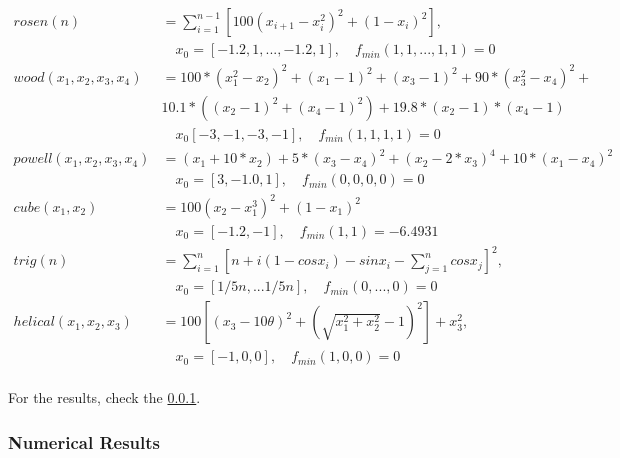 \documentclass[a4paper,11pt]{article}
\numberwithin{equation}{section} %
\begin{document}
\begin{align*}
    rosen(n) &= \sum_{i=1}^{n-1} [100 (x_{i+1}-x_i^2)^2 + (1-x_i)^2], \\ &\quad x_0 = [-1.2,1,...,-1.2,1], \quad f_{min}(1,1,...,1,1)=0  \\
    wood(x_1,x_2,x_3,x_4) &= 100*(x_1^2-x_2)^2 + (x_1-1)^2 + (x_3-1)^2 + 90*(x_3^2 - x_4)^2 + \\ & 10.1*((x_2-1)^2 + (x_4-1)^2) + 19.8*(x_2-1)*(x_4-1)\\ & \quad x_0 [-3,-1,-3,-1], \quad f_{min}(1,1,1,1) = 0 \\
    powell(x_1,x_2,x_3,x_4) &= (x_1+10*x_2) + 5*(x_3-x_4)^2 + (x_2-2*x_3)^4 + 10*(x_1-x_4)^2 \\ & \quad x_0 = [3,-1.0,1], \quad f_{min}(0,0,0,0) = 0 \\
    cube(x_1,x_2) &= 100(x_2-x_1^3)^2 + (1-x_1)^2 \\ & \quad x_0 = [-1.2,-1], \quad f_{min}(1,1) = -6.4931 \\ 
    trig(n) &= \sum_{i=1}^{n}[n + i(1-cosx_i) - sinx_i - \sum_{j=1}^{n}cosx_j]^2,\\ & \quad x_0 = [1/5n,...1/5n], \quad f_{min}(0,...,0) = 0 \\
    helical(x_1,x_2,x_3) &= 100[(x_3-10\theta)^2 + (\sqrt{x_1^2+x_2^2}-1)^2] + x_3^2, \\ & \quad x_0 = [-1,0,0], \quad f_{min}(1,0,0) = 0 \\
\end{align*}

For the results, check the \ref{simulation2}.

\subsubsection{Numerical Results}
\label{simulation2}
\end{document}
